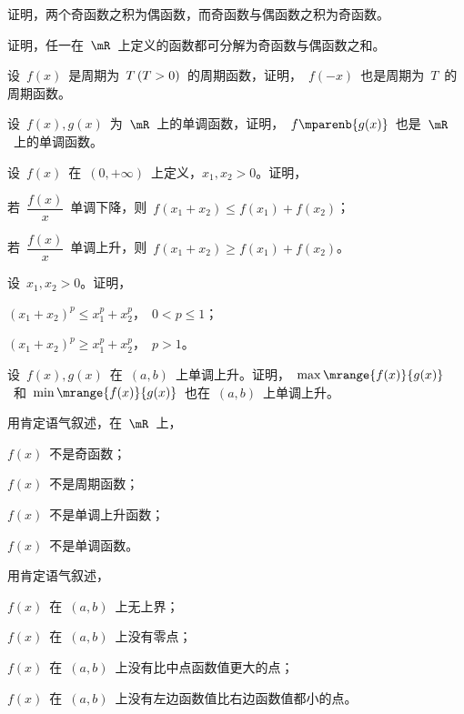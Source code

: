 \begin{exercise}
\begin{exlist}
\end{exlist}
\item 证明，两个奇函数之积为偶函数，而奇函数与偶函数之积为奇函数。
\item 证明，任一在~$\mR$~上定义的函数都可分解为奇函数与偶函数之和。
\item 设~$f(x)$~是周期为~$T\mcond{T>0}$~的周期函数，证明，~$f(-x)$~也是周期为~$T$~的周期函数。
\item 设~$f(x),g(x)$~为~$\mR$~上的单调函数，证明，~$f\mparenb{g(x)}$~也是~$\mR$~上的单调函数。
\item 设~$f(x)$~在~$(0,+\infty)$~上定义，$x_1,x_2>0$。证明，
\begin{exlist}
  \item 若~$\dfrac{f(x)}x$~单调下降，则~$f(x_1+x_2)\leq f(x_1)+f(x_2)$；
  \item 若~$\dfrac{f(x)}x$~单调上升，则~$f(x_1+x_2)\geq f(x_1)+f(x_2)$。
\end{exlist}
\item 设~$x_1,x_2>0$。证明，
\begin{exlistcols}
  \item $(x_1+x_2)^p\leq x_1^p+x_2^p$，~$0<p\leq1$；
  \item $(x_1+x_2)^p\geq x_1^p+x_2^p$，~$p>1$。
\end{exlistcols}
\item 设~$f(x),g(x)$~在~$(a,b)$~上单调上升。证明，~$\max\mrange{f(x)}{g(x)}$~和~$\min\mrange{f(x)}{g(x)}$~也在~$(a,b)$~上单调上升。
\item 用肯定语气叙述，在~$\mR$~上，
\begin{exlistcols}
  \item $f(x)$~不是奇函数；
  \item $f(x)$~不是周期函数；
  \item $f(x)$~不是单调上升函数；
  \item $f(x)$~不是单调函数。
\end{exlistcols}
\item 用肯定语气叙述，
\begin{exlistcols}
  \item $f(x)$~在~$(a,b)$~上无上界；
  \item $f(x)$~在~$(a,b)$~上没有零点；
  \item $f(x)$~在~$(a,b)$~上没有比中点函数值更大的点；
  \item $f(x)$~在~$(a,b)$~上没有左边函数值比右边函数值都小的点。
\end{exlistcols}
\end{exercise}

